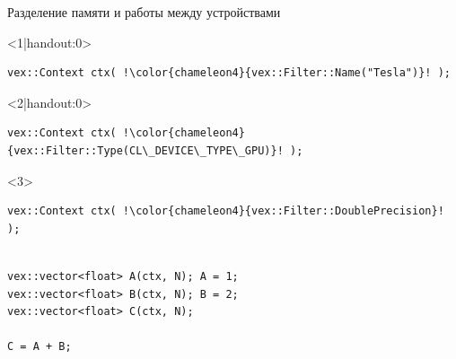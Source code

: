 \documentclass[@BEAMER_OPTIONS@]{beamer}
\begin{document}
\begin{frame}[fragile]{Разделение памяти и работы между устройствами}
    \begin{exampleblock}{}
        \begin{onlyenv}<1|handout:0>
        \begin{lstlisting}[escapechar=!]
vex::Context ctx( !\color{chameleon4}{vex::Filter::Name("Tesla")}! );
        \end{lstlisting}
        \end{onlyenv}
        \begin{onlyenv}<2|handout:0>
        \begin{lstlisting}[escapechar=!]
vex::Context ctx( !\color{chameleon4}{vex::Filter::Type(CL\_DEVICE\_TYPE\_GPU)}! );
        \end{lstlisting}
        \end{onlyenv}
        \begin{onlyenv}<3>
        \begin{lstlisting}[escapechar=!]
vex::Context ctx( !\color{chameleon4}{vex::Filter::DoublePrecision}! );
        \end{lstlisting}
        \end{onlyenv}
        \begin{lstlisting}[firstnumber=last]

vex::vector<float> A(ctx, N); A = 1;
vex::vector<float> B(ctx, N); B = 2;
vex::vector<float> C(ctx, N);

C = A + B;
        \end{lstlisting}
    \end{exampleblock}
    \begin{figure}
\end{figure}
\end{frame}
\end{document}
